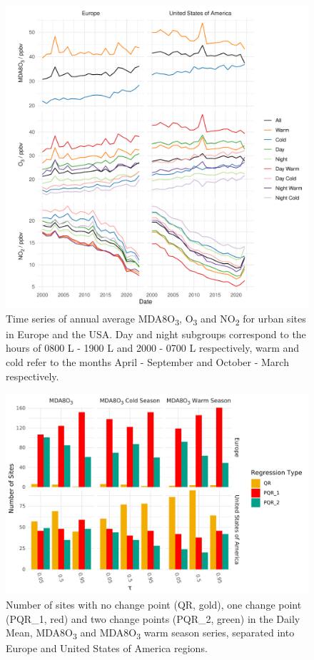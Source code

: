 \documentclass[journal abbreviation, manuscript]{copernicus}
\begin{document}
\begin{figure}[p]
\includegraphics[width=12cm]{figures/paper_figures/f01_overview.pdf}
\caption{Time series of annual average MDA8O\textsubscript{3}, O\textsubscript{3} and NO\textsubscript{2} for urban sites in Europe and the USA. Day and night subgroups correspond to the hours of 0800 L - 1900 L and 2000 - 0700 L respectively, warm and cold refer to the months April - September and October - March respectively.}
\label{fig:conc_plot}
\end{figure}
\clearpage

\begin{figure}[p]
\includegraphics[width=12cm]{figures/paper_figures/f02_regression_type_bars_o3.pdf}
\caption{Number of sites with no change point (QR, gold), one change point (PQR\_1, red) and two change points (PQR\_2, green) in the Daily Mean, MDA8O\textsubscript{3} and MDA8O\textsubscript{3} warm season series, separated into Europe and United States of America regions.}
\label{fig:regression_type}
\end{figure}
\clearpage
\end{document}
